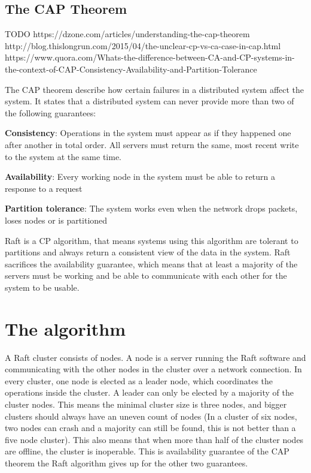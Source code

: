 \subsection{The CAP Theorem}
TODO
https://dzone.com/articles/understanding-the-cap-theorem
http://blog.thislongrun.com/2015/04/the-unclear-cp-vs-ca-case-in-cap.html
https://www.quora.com/Whats-the-difference-between-CA-and-CP-systems-in-the-context-of-CAP-Consistency-Availability-and-Partition-Tolerance

The CAP theorem describe how certain failures in a distributed system affect the system. It states that a distributed system can never provide more than two of the following guarantees:

\textbf{Consistency}: Operations in the system must appear as if they happened one after another in total order. All servers must return the same, most recent write to the system at the same time.

\textbf{Availability}: Every working node in the system must be able to return a response to a request

\textbf{Partition tolerance}: The system works even when the network drops packets, loses nodes or is partitioned

Raft is a CP algorithm, that means systems using this algorithm are tolerant to partitions and always return a consistent view of the data in the system. Raft sacrifices the availability guarantee, which means that at least a majority of the servers must be working and be able to communicate with each other for the system to be usable.

\section{The algorithm}
A Raft cluster consists of nodes. A node is a server running the Raft software and communicating with the other nodes in the cluster over a network connection.
In every cluster, one node is elected as a leader node, which coordinates the operations inside the cluster. A leader can only be elected by
a majority of the cluster nodes. This means the minimal cluster size is three nodes, and bigger clusters should always have an uneven count of nodes (In a cluster
of six nodes, two nodes can crash and a majority can still be found, this is not better than a five node cluster).
This also means that when more than half of the cluster nodes are offline, the cluster is inoperable. This is availability guarantee of the CAP theorem the Raft algorithm gives up
for the other two guarantees. 

